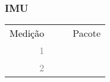 \subsubsection{IMU}
  \begin{table}[h!]
	\begin{tabular}{r l|l p{12cm} }
		\textcolor{black}{Medição} &&& 	{Pacote}\\
		\textcolor{gray}{1} &&& 				{}\\
		\textcolor{gray}{2} &&& 				{}\\
 	\end{tabular}
\end{table}
\label{dados}




  